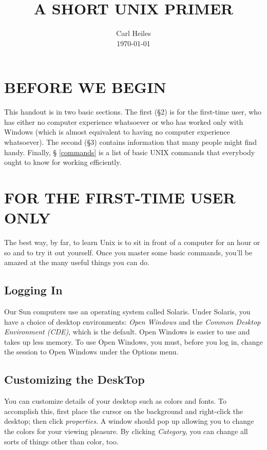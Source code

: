 \pagestyle{plain}


\setlength{\parskip}{.02in}

\title{A SHORT UNIX PRIMER}

\author{Carl Heiles  \\ \today}


\tableofcontents

\section{BEFORE WE BEGIN}\label{intro}

	This handout is in two basic sections.  The first (\S 2) is for
the first-time user, who has either no computer experience whatsoever or
who has worked only with Windows (which is almost equivalent to having
no computer experience whatsoever).  The second (\S 3) contains
information that many people might find handy.  Finally, \S
\ref{commands} is a list of basic UNIX commands that everybody ought to
know for working efficiently. 

\section{FOR THE FIRST-TIME USER ONLY} \label{first}

	The best way, by far, to learn Unix is to sit in front of a
computer for an hour or so and to try it out yourself.  Once you master
some basic commands, you'll be amazed at the many useful things you can
do. 

\subsection{Logging In}\label{login}

	Our Sun computers use an operating system called Solaris.  Under
Solaris, you have a choice of desktop environments: {\it Open Windows}
and the {\it Common Desktop Environment (CDE)}, which is the default. 
Open Windows is easier to use and takes up less memory.  To use Open
Windows, you must, before you log in, change the session to Open Windows
under the Options menu. 

\subsection{Customizing the DeskTop}
	You can customize details of your desktop such as colors and
fonts.  To accomplish this, first place the cursor on the background and
right-click the desktop; then click {\it properties.  } A window should
pop up allowing you to change the colors for your viewing pleasure.  By
clicking {\it Category}, you can change all sorts of things other than
color, too.  

